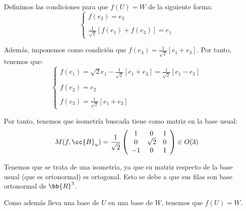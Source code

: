 \documentclass[12pt]{article}
\begin{document}
\begin{ejercicio}
    Definimos las condiciones para que $f(U)=W$ de la siguiente forma:
    \begin{equation*}
        \left\{\begin{array}{l}
             \displaystyle f(e_2)=e_2  \\
             \\
             \displaystyle \frac{1}{\sqrt{2}}[f(e_1)+f(e_3)]=e_1
        \end{array}\right.
    \end{equation*}

    Además, imponemos como condición que $f(e_3)=\frac{1}{\sqrt{2}}[e_1+e_3]$. Por tanto, tenemos que:
    \begin{equation*}
        \left\{\begin{array}{l}
             \displaystyle f(e_1)=\sqrt{2}e_1-\frac{1}{\sqrt{2}}[e_1+e_3]
             = \frac{1}{\sqrt{2}}[e_1-e_3]
             \\ \\
             \displaystyle f(e_2)=e_2  \\
             \\
             \displaystyle f(e_3)=\frac{1}{\sqrt{2}}[e_1+e_3]
        \end{array}\right.
    \end{equation*}

    Por tanto, tenemos que isometría buscada tiene como matriz en la base usual:
    \begin{equation*}
        M(f,\cc{B}_u)=\frac{1}{\sqrt{2}}\left(\begin{array}{ccc}
            1 & 0 & 1 \\
            0 & \sqrt{2} & 0 \\
            -1 & 0 & 1 \\
        \end{array}\right) \in O(3)
    \end{equation*}

    Tenemos que se trata de una isometría, ya que su matriz respecto de la base usual (que es ortonormal) es ortogonal. Esto se debe a que sus filas son base ortonormal de $\bb{R}^3$.

    Como además lleva una base de $U$ en una base de $W$, tenemos que $f(U)=W$.
\end{ejercicio}
\end{document}
